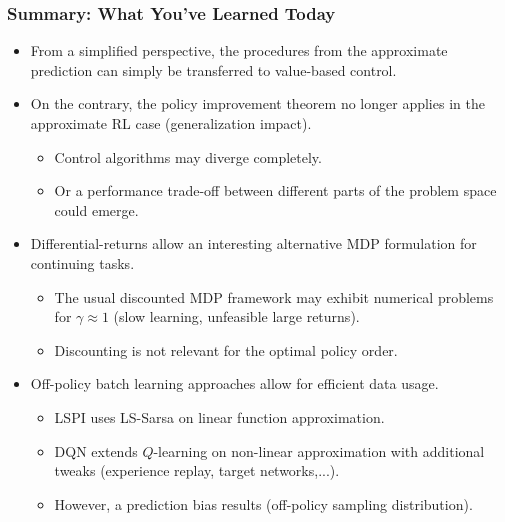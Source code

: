 \begin{frame}
\frametitle{Summary: What You've Learned Today}
\begin{itemize}
	\item From a simplified perspective, the procedures from the approximate prediction can simply be transferred to value-based control.\pause
	\item On the contrary, the policy improvement theorem no longer applies in the approximate RL case (generalization impact).\pause
	\begin{itemize}
		\item Control algorithms may diverge completely.\pause
		\item Or a performance trade-off between different parts of the problem space could emerge.\pause
	\end{itemize}
	\item Differential-returns allow an interesting alternative MDP formulation for continuing tasks.
		\begin{itemize}
		\item The usual discounted MDP framework may exhibit numerical problems for $\gamma\approx 1$ (slow learning, unfeasible large returns).\pause
		\item Discounting is not relevant for the optimal policy order.\pause
	\end{itemize}
	\item Off-policy batch learning approaches allow for efficient data usage.
	\begin{itemize}
		\item LSPI uses LS-Sarsa on linear function approximation.\pause
		\item DQN extends $Q$-learning on non-linear approximation with additional tweaks (experience replay, target networks,...).\pause
		\item However, a prediction bias results (off-policy sampling distribution).  
	\end{itemize}
\end{itemize}
\end{frame}